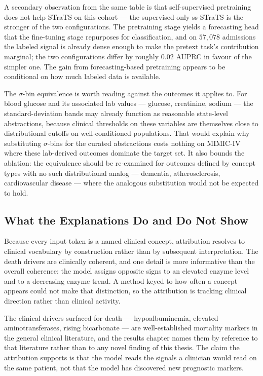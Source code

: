 A secondary observation from the same table is that self-supervised pretraining does not help STraTS on this cohort --- the supervised-only ss-STraTS is the stronger of the two configurations. The pretraining stage yields a forecasting head that the fine-tuning stage repurposes for classification, and on $57{,}078$ admissions the labeled signal is already dense enough to make the pretext task's contribution marginal; the two configurations differ by roughly $0.02$ AUPRC in favour of the simpler one. The gain from forecasting-based pretraining appears to be conditional on how much labeled data is available.

The $\sigma$-bin equivalence is worth reading against the outcomes it applies to. For blood glucose and its associated lab values --- glucose, creatinine, sodium --- the standard-deviation bands may already function as reasonable state-level abstractions, because clinical thresholds on these variables are themselves close to distributional cutoffs on well-conditioned populations. That would explain why substituting $\sigma$-bins for the curated abstractions costs nothing on MIMIC-IV where these lab-derived outcomes dominate the target set. It also bounds the ablation: the equivalence should be re-examined for outcomes defined by concept types with no such distributional analog --- dementia, atherosclerosis, cardiovascular disease --- where the analogous substitution would not be expected to hold.

\subsection{What the Explanations Do and Do Not Show}

Because every input token is a named clinical concept, attribution resolves to clinical vocabulary by construction rather than by subsequent interpretation. The death drivers are clinically coherent, and one detail is more informative than the overall coherence: the model assigns opposite signs to an elevated enzyme level and to a decreasing enzyme trend. A method keyed to how often a concept appears could not make that distinction, so the attribution is tracking clinical direction rather than clinical activity.

The clinical drivers surfaced for death --- hypoalbuminemia, elevated aminotransferases, rising bicarbonate --- are well-established mortality markers in the general clinical literature, and the results chapter names them by reference to that literature rather than to any novel finding of this thesis. The claim the attribution supports is that the model reads the signals a clinician would read on the same patient, not that the model has discovered new prognostic markers.

